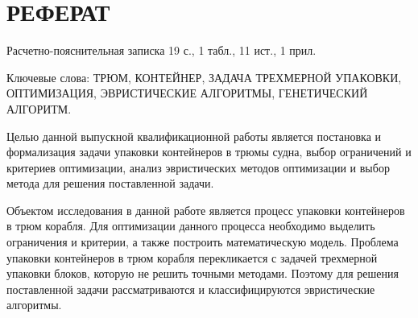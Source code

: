 

\chapter*{\hfill{\centering РЕФЕРАТ}\hfill}

Расчетно-пояснительная записка 19 с., 1 табл., 11 ист., 1 прил.

Ключевые слова: ТРЮМ, КОНТЕЙНЕР, ЗАДАЧА ТРЕХМЕРНОЙ УПАКОВКИ, ОПТИМИЗАЦИЯ, ЭВРИСТИЧЕСКИЕ АЛГОРИТМЫ, ГЕНЕТИЧЕСКИЙ АЛГОРИТМ.

Целью данной выпускной квалификационной работы является постановка и формализация задачи упаковки контейнеров в трюмы судна, выбор ограничений и критериев оптимизации, анализ эвристических методов оптимизации и выбор метода для решения поставленной задачи.

Объектом исследования в данной работе является процесс упаковки контейнеров в трюм корабля. Для оптимизации данного процесса необходимо выделить ограничения и критерии, а также построить математическую модель. Проблема упаковки контейнеров в трюм корабля перекликается с задачей трехмерной упаковки блоков, которую не решить точными методами. Поэтому для решения поставленной задачи рассматриваются и классифицируются эвристические алгоритмы.